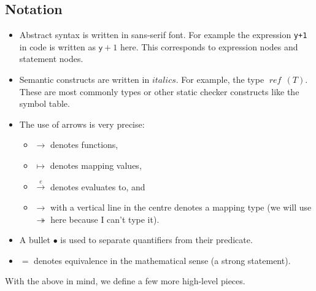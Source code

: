 \documentclass[10pt,a4paper,]{article}
\providecommand{\tightlist}{%
  \setlength{\itemsep}{0pt}\setlength{\parskip}{0pt}}
\begin{document}
\hypertarget{notation}{%
\subsection{Notation}\label{notation}}

\begin{itemize}
\tightlist
\item
  Abstract syntax is written in sans-serif font. For example the
  expression \texttt{y+1} in code is written as \(\textsf {y} + 1\)
  here. This corresponds to expression nodes and statement nodes.
\item
  Semantic constructs are written in \(\textit{italics}\). For example,
  the type \(\operatorname{\textit{ref}}\,(T)\). These are most commonly
  types or other static checker constructs like the symbol table.
\item
  The use of arrows is very precise:

  \begin{itemize}
  \tightlist
  \item
    \(\to\) denotes functions,
  \item
    \(\mapsto\) denotes mapping values,
  \item
    \(\overset e\to\) denotes evaluates to, and
  \item
    \(\to\) with a vertical line in the centre denotes a mapping type
    (we will use \(\twoheadrightarrow\) here because I can't type it).
  \end{itemize}
\item
  A bullet \(\bullet\) is used to separate quantifiers from their
  predicate.
\item
  \(=\) denotes equivalence in the mathematical sense (a strong
  statement).
\end{itemize}

With the above in mind, we define a few more high-level pieces.
\end{document}
